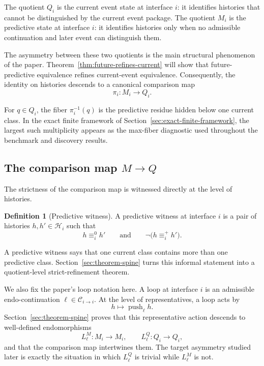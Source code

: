 \documentclass[11pt]{article}
\newcommand{\CurrentQ}{Q}
\newcommand{\PredictiveQ}{M}
\newcommand{\Histories}{\mathcal{H}}
\newcommand{\CurrentEquiv}{\equiv^{0}}
\newcommand{\FutureEquiv}{\equiv^{+}}
\theoremstyle{definition}
\newtheorem{definition}[theorem]{Definition}
\begin{document}
The quotient $\CurrentQ_i$ is the current event state at interface $i$: it identifies histories that cannot be distinguished by the current event package. The quotient $\PredictiveQ_i$ is the predictive state at interface $i$: it identifies histories only when no admissible continuation and later event can distinguish them.

The asymmetry between these two quotients is the main structural phenomenon of the paper. Theorem~\ref{thm:future-refines-current} will show that future-predictive equivalence refines current-event equivalence. Consequently, the identity on histories descends to a canonical comparison map
\begin{equation}
\pi_i : \PredictiveQ_i \to \CurrentQ_i.
\label{eq:comparison-map}
\end{equation}

For $q\in\CurrentQ_i$, the fiber $\pi_i^{-1}(q)$ is the predictive residue hidden below one current class. In the exact finite framework of Section~\ref{sec:exact-finite-framework}, the largest such multiplicity appears as the max-fiber diagnostic used throughout the benchmark and discovery results.

\subsection{The comparison map \texorpdfstring{$\PredictiveQ \to \CurrentQ$}{M to Q}}\label{subsec:rtp-comparison}
The strictness of the comparison map is witnessed directly at the level of histories.

\begin{definition}[Predictive witness]\label{def:predictive-witness}
A predictive witness at interface $i$ is a pair of histories $h,h'\in\Histories_i$ such that
\begin{equation}
h \CurrentEquiv_i h'
\qquad\text{and}\qquad
\neg\bigl(h \FutureEquiv_i h'\bigr).
\label{eq:predictive-witness}
\end{equation}
\end{definition}

A predictive witness says that one current class contains more than one predictive class. Section~\ref{sec:theorem-spine} turns this informal statement into a quotient-level strict-refinement theorem.

We also fix the paper's loop notation here. A loop at interface $i$ is an admissible endo-continuation $\ell\in\mathcal{C}_{i\to i}$. At the level of representatives, a loop acts by
\begin{equation}
h \longmapsto \operatorname{push}_{\ell} h.
\label{eq:loop-representative-action}
\end{equation}
Section~\ref{sec:theorem-spine} proves that this representative action descends to well-defined endomorphisms
\[
L^{\PredictiveQ}_{\ell} : \PredictiveQ_i \to \PredictiveQ_i,
\qquad
L^{\CurrentQ}_{\ell} : \CurrentQ_i \to \CurrentQ_i,
\]
and that the comparison map intertwines them. The target asymmetry studied later is exactly the situation in which $L^{\CurrentQ}_{\ell}$ is trivial while $L^{\PredictiveQ}_{\ell}$ is not.
\end{document}
